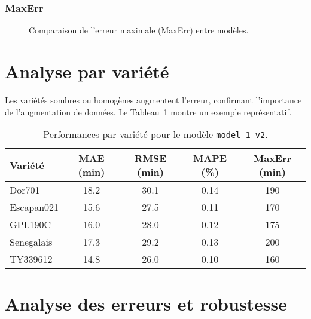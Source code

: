 \subsubsection{MaxErr}
\begin{figure}[h!]
\centering
{}
\caption{Comparaison de l’erreur maximale (MaxErr) entre modèles.}
\label{fig:maxerr_all}
\end{figure}

\section{Analyse par variété}
\label{subsec:analyse_variete}

Les variétés sombres ou homogènes augmentent l’erreur, confirmant l’importance de l’augmentation de données. Le Tableau~\ref{tab:variete_stats} montre un exemple représentatif.

\begin{table}[h!]
\centering
\caption{Performances par variété pour le modèle \texttt{model\_1\_v2}.}
\label{tab:variete_stats}
\begin{tabular}{|l|c|c|c|c|}
\hline
\textbf{Variété} & \textbf{MAE (min)} & \textbf{RMSE (min)} & \textbf{MAPE (\%)} & \textbf{MaxErr (min)} \\
\hline
Dor701 & 18.2 & 30.1 & 0.14 & 190 \\
Escapan021 & 15.6 & 27.5 & 0.11 & 170 \\
GPL190C & 16.0 & 28.0 & 0.12 & 175 \\
Senegalais & 17.3 & 29.2 & 0.13 & 200 \\
TY339612 & 14.8 & 26.0 & 0.10 & 160 \\
\hline
\end{tabular}
\end{table}

\section{Analyse des erreurs et robustesse}
\label{sec:erreurs_robustesse}

